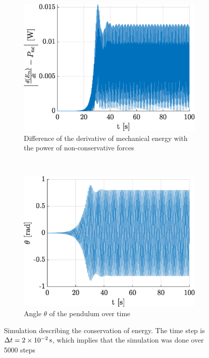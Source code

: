 \documentclass[a4paper,12pt,twoside]{article}
\begin{document}
\begin{figure}[h]
\centering
\begin{subfigure}[t]{0.45\textwidth}
	\includegraphics[width=\textwidth]{graphs/d_thm.eps}
	\caption{Difference of the derivative of mechanical energy with the power of non-conservative forces}
	\label{fig:d-thm-energie}
\end{subfigure}
~
\begin{subfigure}[t]{0.45\textwidth}
	\includegraphics[width=\textwidth]{graphs/d_theta.eps}
	\caption{Angle $\theta$ of the pendulum over time}
	\label{fig:d-thm-theta}
\end{subfigure}
\caption{Simulation describing the conservation of energy. The time step is $\Delta t=\SI{2d-2}{\s}$, which implies that the simulation was done over \num{5000} steps}
\label{fig:d-thm}
\end{figure}
\end{document}
